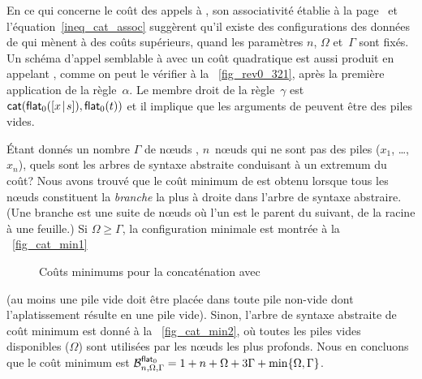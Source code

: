 En ce qui concerne le coût des appels à , son associativité
 établie à la page~\pageref{proof_assoc_cat} et
l'équation~\eqref{ineq_cat_assoc}  suggèrent
qu'il existe des configurations des données de
 qui mènent à des
coûts supérieurs, quand les paramètres \(n\), \(\Omega\) et~\(\Gamma\)
sont fixés. Un schéma d'appel semblable à
 avec un coût quadratique est aussi
produit en appelant ,
comme on peut le vérifier à la \fig~\vref{fig_rev0_321}, après la
première application de la règle~\(\alpha\). Le membre droit de la
règle~\(\gamma\) est
\(\fun{cat}(\fun{flat}_0(\cons{x}{s}),\fun{flat}_0(t))\)
 et il implique que les arguments de
 peuvent être des piles vides.

Étant donnés un nombre \(\Gamma\) de n{\oe}uds ,
\(n\)~n{\oe}uds qui ne sont pas des piles (\(x_1\), \dots, \(x_n\)),
quels sont les arbres de syntaxe abstraite conduisant à un extremum du
coût? Nous avons trouvé que le coût minimum de
 est obtenu lorsque tous les
n{\oe}uds  constituent la \emph{branche}
la plus à droite dans l'arbre de syntaxe abstraire. (Une branche est
une suite de n{\oe}uds où l'un est le parent du suivant, de la racine
à une feuille.) Si \(\Omega \geqslant \Gamma\), la configuration
minimale est montrée à la \fig~\ref{fig_cat_min1}
\begin{figure}
\centering
{}
\quad
{}
\caption{Coûts minimums pour la concaténation avec 
\label{fig_cat_min}}
\end{figure}
(au moins une pile vide doit être placée dans toute pile non-vide dont
l'aplatissement résulte en une pile vide). Sinon, l'arbre de syntaxe
abstraite de coût minimum est donné à la \fig~\ref{fig_cat_min2}, où
toutes les piles vides disponibles (\(\Omega\)) sont utilisées par les
n{\oe}uds  les plus profonds. Nous en concluons que le coût
minimum
est
\(\B{\fun{flat}_0}{n,\Omega,\Gamma} = 1 + n + \Omega + 3\Gamma +
\min\{\Omega,\Gamma\}\).

